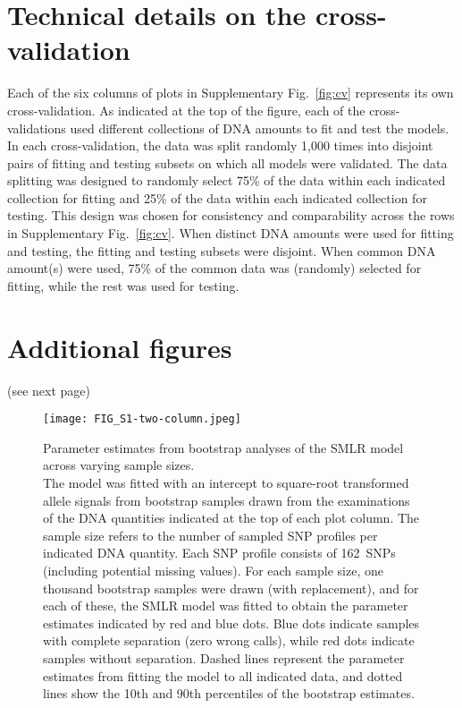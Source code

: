 \documentclass[preprint,5p,times,11pt]{elsarticle}
\begin{document}
\newpage
\section*{Technical details on the cross-validation}
Each of the six columns of plots in Supplementary Fig.~\ref{fig:cv} represents its own cross-validation.
As indicated at the top of the figure, each of the cross-validations used different collections of DNA amounts to fit and test the models.
In each cross-validation, the data was split randomly 1,000 times into disjoint pairs of fitting and testing subsets on which all models were validated.
The data splitting was designed to randomly select 75\% of the data within each indicated collection for fitting and 25\% of the data within each indicated collection for testing.
This design was chosen for consistency and comparability across the rows in Supplementary Fig.~\ref{fig:cv}.
When distinct DNA amounts were used for fitting and testing, the fitting and testing subsets were disjoint.
When common DNA amount(s) were used, 75\% of the common data was (randomly) selected for fitting, while the rest was used for testing.


\vspace{2cm}
\section*{Additional figures}
\noindent (see next page)


\begin{landscape}
\begin{figure*}
\centering
\texttt{[image: FIG\_S1-two-column.jpeg]}
\caption{
Parameter estimates from bootstrap analyses of the SMLR model across varying sample sizes.\\
The model was fitted with an intercept to square-root transformed allele signals from bootstrap samples drawn from the examinations of the DNA quantities indicated at the top of each plot column.
The sample size refers to the number of sampled SNP profiles per indicated DNA quantity.
Each SNP profile consists of 162~SNPs (including potential missing values).
For each sample size, one thousand bootstrap samples were drawn (with replacement), and for each of these, the SMLR model was fitted to obtain the parameter estimates indicated by red and blue dots.
Blue dots indicate samples with complete separation (zero wrong calls), while red dots indicate samples without separation.
Dashed lines represent the parameter estimates from fitting the model to all indicated data, and dotted lines show the 10th and 90th percentiles of the bootstrap estimates.
}
\label{fig:bootstrap}
\end{figure*}
\end{landscape}
\end{document}
